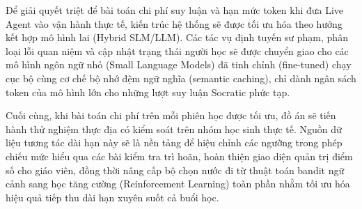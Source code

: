 Để giải quyết triệt để bài toán chi phí suy luận và hạn mức token khi đưa Live Agent vào vận hành thực tế, kiến trúc hệ thống sẽ được tối ưu hóa theo hướng kết hợp mô hình lai (Hybrid SLM/LLM). Các tác vụ định tuyến sư phạm, phân loại lỗi quan niệm và cập nhật trạng thái người học sẽ được chuyển giao cho các mô hình ngôn ngữ nhỏ (Small Language Models) đã tinh chỉnh (fine-tuned) chạy cục bộ cùng cơ chế bộ nhớ đệm ngữ nghĩa (semantic caching), chỉ dành ngân sách token của mô hình lớn cho những lượt suy luận Socratic phức tạp. 
 
Cuối cùng, khi bài toán chi phí trên mỗi phiên học được tối ưu, đồ án sẽ tiến hành thử nghiệm thực địa có kiểm soát trên nhóm học sinh thực tế. Nguồn dữ liệu tương tác dài hạn này sẽ là nền tảng để hiệu chỉnh các ngưỡng trong phép chiếu mức hiểu qua các bài kiểm tra trì hoãn, hoàn thiện giao diện quản trị điểm số cho giáo viên, đồng thời nâng cấp bộ chọn nước đi từ thuật toán bandit ngữ cảnh sang học tăng cường (Reinforcement Learning) toàn phần nhằm tối ưu hóa hiệu quả tiếp thu dài hạn xuyên suốt cả buổi học.
